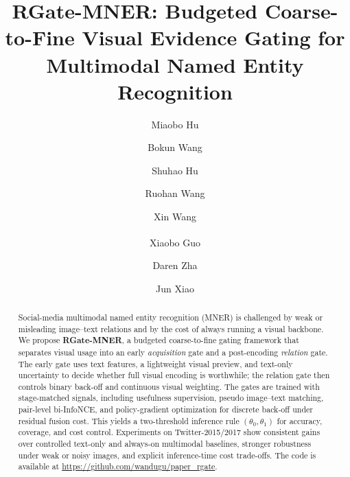 \documentclass{llncs}
\DeclareRobustCommand{\corrmark}{\textsuperscript{\normalfont\scriptsize\Envelope}}
\begin{document}
\pagestyle{empty}

\title{RGate-MNER: Budgeted Coarse-to-Fine Visual Evidence Gating for Multimodal Named Entity Recognition}
\author{
Miaobo Hu \and
Bokun Wang \and
Shuhao Hu \and
Ruohan Wang \and
Xin Wang \and
Xiaobo Guo\corrmark{} \and
Daren Zha \and
Jun Xiao
}


\maketitle
\thispagestyle{empty}


\begin{abstract}
Social-media multimodal named entity recognition (MNER) is challenged by weak or misleading image--text relations and by the cost of always running a visual backbone. We propose \textbf{RGate-MNER}, a budgeted coarse-to-fine gating framework that separates visual usage into an early \emph{acquisition} gate and a post-encoding \emph{relation} gate. The early gate uses text features, a lightweight visual preview, and text-only uncertainty to decide whether full visual encoding is worthwhile; the relation gate then controls binary back-off and continuous visual weighting. The gates are trained with stage-matched signals, including usefulness supervision, pseudo image--text matching, pair-level bi-InfoNCE, and policy-gradient optimization for discrete back-off under residual fusion cost. This yields a two-threshold inference rule $(\theta_0,\theta_1)$ for accuracy, coverage, and cost control. Experiments on Twitter-2015/2017 show consistent gains over controlled text-only and always-on multimodal baselines, stronger robustness under weak or noisy images, and explicit inference-time cost trade-offs. The code is available at \url{https://github.com/wandugu/paper_rgate}.


\end{abstract}
\end{document}
